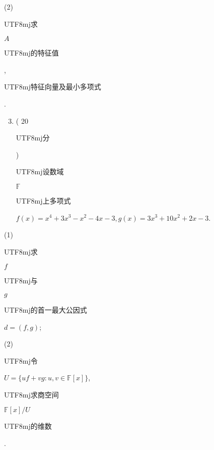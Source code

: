 \documentclass[10pt]{article}
\begin{document}
(2) \begin{CJK}{UTF8}{mj}求\end{CJK} $A$ \begin{CJK}{UTF8}{mj}的特征值\end{CJK}, \begin{CJK}{UTF8}{mj}特征向量及最小多项式\end{CJK}.

\begin{enumerate}
  \setcounter{enumi}{2}
  \item ( 20 \begin{CJK}{UTF8}{mj}分\end{CJK}) \begin{CJK}{UTF8}{mj}设数域\end{CJK} $\mathbb{F}$ \begin{CJK}{UTF8}{mj}上多项式\end{CJK} $f(x)=x^{4}+3 x^{3}-x^{2}-4 x-3, g(x)=3 x^{3}+10 x^{2}+2 x-3$.
\end{enumerate}
(1) \begin{CJK}{UTF8}{mj}求\end{CJK} $f$ \begin{CJK}{UTF8}{mj}与\end{CJK} $g$ \begin{CJK}{UTF8}{mj}的首一最大公因式\end{CJK} $d=(f, g)$;

(2) \begin{CJK}{UTF8}{mj}令\end{CJK} $U=\{u f+v g: u, v \in \mathbb{F}[x]\}$, \begin{CJK}{UTF8}{mj}求商空间\end{CJK} $\mathbb{F}[x] / U$ \begin{CJK}{UTF8}{mj}的维数\end{CJK}.
\end{document}
